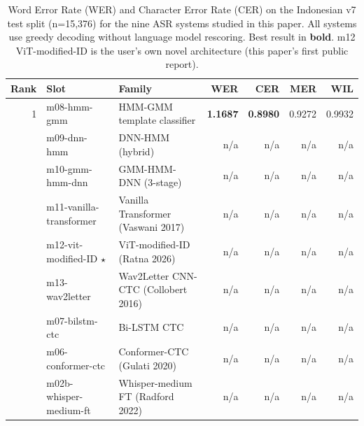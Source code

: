 \begin{table}[t]
  \centering
  \caption{Word Error Rate (WER) and Character Error Rate (CER) on the Indonesian v7 test split (n=15{,}376) for the nine ASR systems studied in this paper. All systems use greedy decoding without language model rescoring. Best result in \textbf{bold}. m12 ViT-modified-ID is the user's own novel architecture (this paper's first public report).}
  \label{tab:paper_benchmark}
  \small
  \begin{tabular}{rllrrrr}
  \hline
  Rank & Slot & Family & WER & CER & MER & WIL \\
  \hline
  1 & m08-hmm-gmm & HMM-GMM template classifier & \textbf{1.1687} & \textbf{0.8980} & 0.9272 & 0.9932 \\
   & m09-dnn-hmm & DNN-HMM (hybrid) & n/a & n/a & n/a & n/a \\
   & m10-gmm-hmm-dnn & GMM-HMM-DNN (3-stage) & n/a & n/a & n/a & n/a \\
   & m11-vanilla-transformer & Vanilla Transformer (Vaswani 2017) & n/a & n/a & n/a & n/a \\
   & m12-vit-modified-ID $\star$ & ViT-modified-ID (Ratna 2026) & n/a & n/a & n/a & n/a \\
   & m13-wav2letter & Wav2Letter CNN-CTC (Collobert 2016) & n/a & n/a & n/a & n/a \\
   & m07-bilstm-ctc & Bi-LSTM CTC & n/a & n/a & n/a & n/a \\
   & m06-conformer-ctc & Conformer-CTC (Gulati 2020) & n/a & n/a & n/a & n/a \\
   & m02b-whisper-medium-ft & Whisper-medium FT (Radford 2022) & n/a & n/a & n/a & n/a \\
  \hline
  \end{tabular}
\end{table}